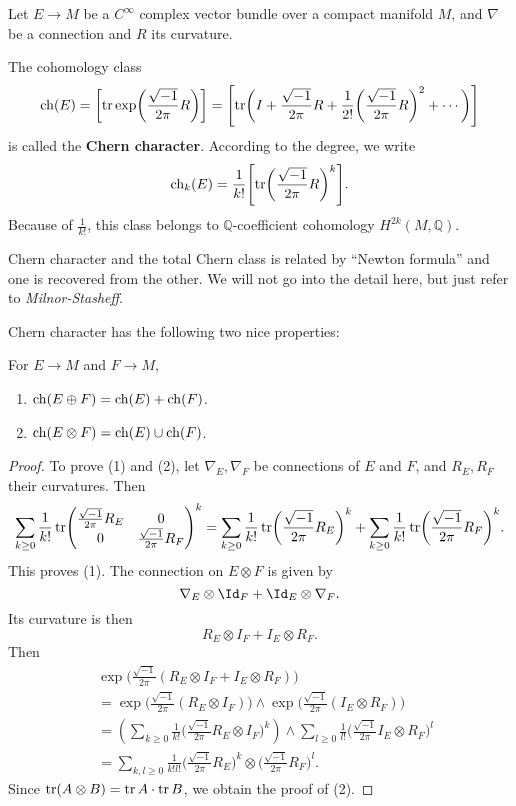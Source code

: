 \documentclass[12pt]{article}
\begin{document}
Let \(E\to M\) be a \(C^\infty\) complex vector bundle over a compact manifold \(M\),
and \(\nabla\) be a connection and \(R\) its curvature.

\begin{definition}
  The cohomology class \[
    \op{ch}(E)=\left[\op{tr}\exp\biggl(\frac{\sqrt{-1}}{2\pi}R\biggr)\right]
    =\left[\op{tr}\biggl(I+\frac{\sqrt{-1}}{2\pi}R+\frac{1}{2!}\biggl(
    \frac{\sqrt{-1}}{2\pi}R\biggr)^2+\cdots\biggr)\right]
  \] is called the \textbf{Chern character}.
  According to the degree, we write \[
    \op{ch}_k(E)=\frac{1}{k!}\left[\op{tr}\biggl(\frac{\sqrt{-1}}{2\pi}R\biggr)^k
    \right]
  .\] Because of \(\frac{1}{k!}\), this class belongs to \(\mathbb{Q}\)-coefficient
  cohomology \(H^{2k}(M,\mathbb{Q})\).
\end{definition}

Chern character and the total Chern class is related by ``Newton formula'' and one 
is recovered from the other. We will not go into the detail here, but just refer
to \emph{Milnor-Stasheff}.

Chern character has the following two nice properties: 
\begin{lemma}\label{lem:25-chern-character}
For \(E\to M\) and \(F\to M\),
\begin{enumerate}[(1)]
  \item \(\operatorname{ch}(E\oplus F)=\operatorname{ch}(E)+\operatorname{ch}(F)\).
  \item \(\operatorname{ch}(E\otimes F)=\operatorname{ch}(E)\cup\operatorname{ch}(F)\).
\end{enumerate}
\end{lemma}
\begin{proof}
To prove (1) and (2), let \(\nabla_E,\nabla_F\) be connections of \(E\) and \(F\),
and \(R_E,R_F\) their curvatures. Then \[
  \sum_{k\ge 0}\frac{1}{k!}\op{tr}\begin{pmatrix}
    \frac{\sqrt{-1}}{2\pi}R_E & 0 \\
    0 & \frac{\sqrt{-1}}{2\pi}R_F
  \end{pmatrix}^k
  =\sum_{k\ge 0}\frac{1}{k!}\op{tr}\biggl(\frac{\sqrt{-1}}{2\pi}R_E\biggr)^k
  +\sum_{k\ge 0}\frac{1}{k!}\op{tr}\biggl(\frac{\sqrt{-1}}{2\pi}R_F\biggr)^k
.\] This proves (1). The connection on \(E\otimes F\) is given by \[
  \nabla_E\otimes\Id_F+\Id_E\otimes\nabla_F
.\] Its curvature is then \[
  R_E\otimes I_F+I_E\otimes R_F
.\] Then
\begin{align*}
  &\exp\biggl(\frac{\sqrt{-1}}{2\pi}(R_E\otimes I_F+I_E\otimes R_F)\biggr) \\
  &=\exp\biggl(\frac{\sqrt{-1}}{2\pi}(R_E\otimes I_F)\biggr)\wedge
  \exp\biggl(\frac{\sqrt{-1}}{2\pi}(I_E\otimes R_F)\biggr) \\
  &=\left(\sum_{k\ge 0}\frac{1}{k!}\biggl(\frac{\sqrt{-1}}{2\pi}R_E\otimes I_F\biggr)^k
  \right)\wedge\sum_{l\ge 0}\frac{1}{l!}\biggl(\frac{\sqrt{-1}}{2\pi}I_E\otimes R_F
  \biggr)^l \\
  &=\sum_{k,l\ge 0}\frac{1}{k!l!}\biggl(\frac{\sqrt{-1}}{2\pi}R_E\biggr)^k\otimes 
  \biggl(\frac{\sqrt{-1}}{2\pi}R_F\biggr)^l
.\end{align*} 
Since \(\operatorname{tr}(A\otimes B)=\operatorname{tr}A\cdot \operatorname{tr}B\), we obtain the proof of (2).
\end{proof}
\end{document}
